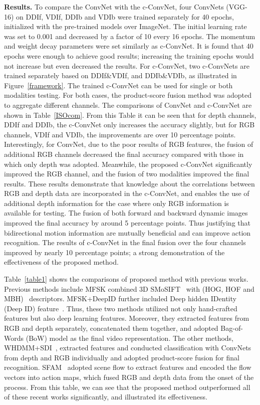 \documentclass[letterpaper]{article} %
\begin{document}
\textbf{Results.} To compare the ConvNet with the c-ConvNet, four ConvNets
(VGG-16) on DDIf, VDIf, DDIb and VDIb were trained separately for 40 epochs,
initialized with the pre-trained models over ImageNet. The initial learning rate
was set to 0.001 and decreased by a factor of 10 every 16 epochs.  The momentum
and weight decay parameters were set similarly as c-ConvNet. It is
found that 40 epochs were enough to achieve good results; increasing the
training epochs would not increase but even decreased the results.  For
c-ConvNet, two c-ConvNets are trained separately based on DDIf\&VDIf, and
DDIb\&VDIb, as illustrated in Figure~\ref{framework}. The trained c-ConvNet can
be used for single or both modalities testing. For
both cases, the product-score fusion method was adopted to aggregate different
channels.
The comparisons of ConvNet and c-ConvNet are shown in Table~\ref{ISOcom}.
From this Table it can be seen that for depth channels, DDIf and DDIb, the
c-ConvNet only increases the accuracy slightly, but for RGB
channels, VDIf and VDIb, the improvements are over 10 percentage points.
Interestingly, for ConvNet, due to the poor results of RGB features, the fusion
of additional RGB channels decreased the final accuracy compared with
those in which  only depth  was adopted. Meanwhile, the proposed c-ConvNet
significantly improved the RGB channel, and the fusion of two modalities
improved the final results.
These results demonstrate that knowledge about the correlations between
RGB and depth data are incorporated in the c-ConvNet, and enables the use of
additional depth information for the case where only RGB information is
available for testing. The fusion of both forward and backward dynamic images
improved the final accuracy by around 5 percentage points. Thus justifying
that bidirectional motion information are mutually beneficial and can
improve action recognition. The results of c-ConvNet in the final fusion
over the four channels improved by nearly 10 percentage points; a strong
demonstration of the effectiveness of the proposed method.


Table~\ref{table1} shows the comparisons of proposed method with previous works.
 Previous methods include MFSK combined 3D SMoSIFT~\cite{wan20143d} with
(HOG, HOF and MBH)~\cite{wang2013action} descriptors.  MFSK+DeepID further
included Deep hidden IDentity (Deep ID) feature~\cite{sun2014deep}. Thus, these
two methods utilized not only hand-crafted features but also deep learning
features. Moreover, they extracted features from RGB and depth separately,
concatenated them together, and adopted Bag-of-Words (BoW) model as the final
video representation. The other methods,
WHDMM+SDI~\cite{pichaoTHMS,bilen2016dynamic}, extracted features and conducted
classification with ConvNets from depth and RGB individually and adopted
product-score fusion for final recognition. SFAM~\cite{Pichaocvpr2017} adopted
scene flow to extract features and encoded the flow vectors into action maps,
which fused RGB and depth data from the onset of the process.
From this table, we can see that the proposed method outperformed all of these
recent works significantly, and illustrated its effectiveness.
\end{document}
